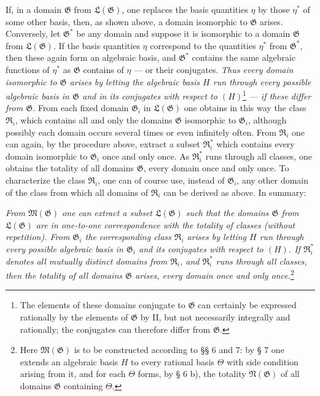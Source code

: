 \documentclass[11pt]{article}
\begin{document}
If, in a domain $\mathfrak G$ from $\mathfrak L(\mathfrak G)$, one replaces the
basis quantities $\eta$ by those $\eta^*$ of some other basis, then, as shown
above, a domain isomorphic to $\mathfrak G$ arises. Conversely, let
$\mathfrak G^*$ be any domain and suppose it is isomorphic to a domain
$\mathfrak G$ from $\mathfrak L(\mathfrak G)$. If the basis quantities $\eta$
correspond to the quantities $\eta^*$ from $\mathfrak G^*$, then these again form
an algebraic basis, and $\mathfrak G^*$ contains the same algebraic functions of
$\eta^*$ as $\mathfrak G$ contains of $\eta$ --- or their conjugates. \emph{Thus
every domain isomorphic to $\mathfrak G$ arises by letting the algebraic basis
$H$ run through every possible algebraic basis in $\mathfrak G$ and in its
conjugates with respect to $(H)$}\footnote{The elements of these domains
conjugate to $\mathfrak G$ can certainly be expressed rationally by the elements
of $\mathfrak G$ by II, but not necessarily integrally and rationally; the
conjugates can therefore differ from $\mathfrak G$.} \emph{--- if these differ
from $\mathfrak G$.} From each fixed domain $\mathfrak G_i$ in
$\mathfrak L(\mathfrak G)$ one obtains in this way the class $\mathfrak R_i$,
which contains all and only the domains $\mathfrak G$ isomorphic to
$\mathfrak G_i$, although possibly each domain occurs several times or even
infinitely often. From $\mathfrak R_i$ one can again, by the procedure above,
extract a subset $\mathfrak R_i^*$ which contains every domain isomorphic to
$\mathfrak G_i$ once and only once. As $\mathfrak R_i^*$ runs through all
classes, one obtains the totality of all domains $\mathfrak G$, every domain once
and only once. To characterize the class $\mathfrak R_i$, one can of course use,
instead of $\mathfrak G_i$, any other domain of the class from which all domains
of $\mathfrak R_i$ can be derived as above. In summary:

\emph{From $\mathfrak M(\mathfrak G)$ one can extract a subset
$\mathfrak L(\mathfrak G)$ such that the domains $\mathfrak G$ from
$\mathfrak L(\mathfrak G)$ are in one-to-one correspondence with the totality of
classes (without repetition). From $\mathfrak G_i$ the corresponding class
$\mathfrak R_i$ arises by letting $H$ run through every possible algebraic basis
in $\mathfrak G_i$ and its conjugates with respect to $(H)$. If
$\mathfrak R_i^*$ denotes all mutually distinct domains from $\mathfrak R_i$, and
$\mathfrak R_i^*$ runs through all classes, then the totality of all domains
$\mathfrak G$ arises, every domain once and only once.}\footnote{Here
$\mathfrak M(\mathfrak G)$ is to be constructed according to §§ 6 and 7: by § 7
one extends an algebraic basis $H$ to every rational basis $\Theta$ with side
condition arising from it, and for each $\Theta$ forms, by § 6 b), the totality
$\mathfrak N(\mathfrak G)$ of all domains $\mathfrak G$ containing $\Theta$.}
\end{document}
